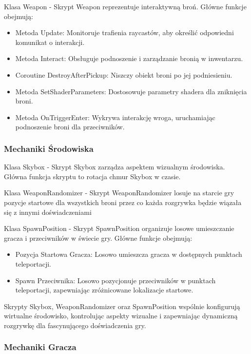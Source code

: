Klasa Weapon -
Skrypt Weapon reprezentuje interaktywną broń. Główne funkcje obejmują:
\begin{itemize}
  \item Metoda Update: Monitoruje trafienia raycastów, aby określić odpowiedni komunikat o interakcji.
  \item Metoda Interact: Obsługuje podnoszenie i zarządzanie bronią w inwentarzu.
  \item Coroutine DestroyAfterPickup: Niszczy obiekt broni po jej podniesieniu.
  \item Metoda SetShaderParameters: Dostosowuje parametry shadera dla zniknięcia broni.
  \item Metoda OnTriggerEnter: Wykrywa interakcję wroga, uruchamiając podnoszenie broni dla przeciwników.
\end{itemize}

\subsubsection{Mechaniki Środowiska}

Klasa Skybox \label{subsubsec:skybox}
-  Skrypt Skybox zarządza aspektem wizualnym środowiska. Główna funkcja skryptu to rotacja chmur Skybox w czasie.

Klasa WeaponRandomizer
- Skrypt WeaponRandomizer losuje na starcie gry pozycje startowe dla wszystkich broni przez co każda rozgrywka będzie wiązała się z innymi doświadczeniami

Klasa SpawnPosition -
Skrypt SpawnPosition organizuje losowe umieszczanie gracza i przeciwników w świecie gry. Główne funkcje obejmują:
\begin{itemize}
  \item Pozycja Startowa Gracza: Losowo umieszcza gracza w dostępnych punktach teleportacji.
  \item Spawn Przeciwnika: Losowo pozycjonuje przeciwników w punktach teleportacji, zapewniając zróżnicowane lokalizacje startowe.
\end{itemize}

Skrypty Skybox, WeaponRandomizer oraz SpawnPosition wspólnie konfigurują wirtualne środowisko, kontrolując aspekty wizualne i zapewniając dynamiczną rozgrywkę dla fascynującego doświadczenia gry.

\subsubsection{Mechaniki Gracza}

